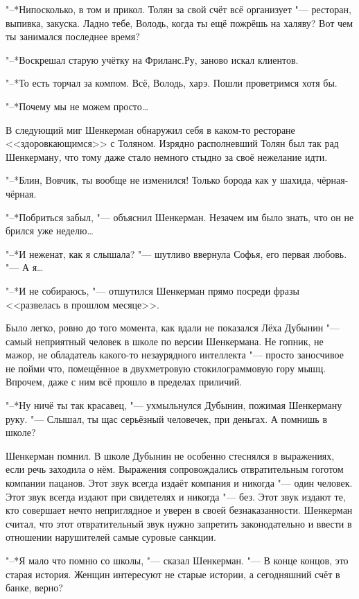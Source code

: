 "--*Нипосколько, в том и прикол.
Толян за свой счёт всё организует "--- ресторан, выпивка, закуска.
Ладно тебе, Володь, когда ты ещё пожрёшь на халяву?
Вот чем ты занимался последнее время?

"--*Воскрешал старую учётку на Фриланс.Ру, заново искал клиентов.

"--*То есть торчал за компом.
Всё, Володь, харэ.
Пошли проветримся хотя бы.

"--*Почему мы не можем просто\dots{}

В следующий миг Шенкерман обнаружил себя в каком-то ресторане <<здоровкающимся>> с Толяном.
Изрядно располневший Толян был так рад Шенкерману, что тому даже стало немного стыдно за своё нежелание идти.

"--*Блин, Вовчик, ты вообще не изменился!
Только борода как у шахида, чёрная-чёрная.

"--*Побриться забыл, "--- объяснил Шенкерман.
Незачем им было знать, что он не брился уже неделю\dots{}

"--*И неженат, как я слышала? "--- шутливо ввернула Софья, его первая любовь.
"--- А я\dots{}

"--*И не собираюсь, "--- отшутился Шенкерман прямо посреди фразы <<развелась в прошлом месяце>>.

Было легко, ровно до того момента, как вдали не показался Лёха Дубынин "--- самый неприятный человек в школе по версии Шенкермана.
Не гопник, не мажор, не обладатель какого-то незаурядного интеллекта "--- просто заносчивое не пойми что, помещённое в двухметровую стокилограммовую гору мышц.
Впрочем, даже с ним всё прошло в пределах приличий.

"--*Ну ничё ты так красавец, "--- ухмыльнулся Дубынин, пожимая Шенкерману руку.
"--- Слышал, ты щас серьёзный человечек, при деньгах.
А помнишь в школе?

Шенкерман помнил.
В школе Дубынин не особенно стеснялся в выражениях, если речь заходила о нём.
Выражения сопровождались отвратительным гоготом компании пацанов.
Этот звук всегда издаёт компания и никогда "--- один человек.
Этот звук всегда издают при свидетелях и никогда "--- без.
Этот звук издают те, кто совершает нечто неприглядное и уверен в своей безнаказанности.
Шенкерман считал, что этот отвратительный звук нужно запретить законодательно и ввести в отношении нарушителей самые суровые санкции.

"--*Я мало что помню со школы, "--- сказал Шенкерман.
"--- В конце концов, это старая история.
Женщин интересуют не старые истории, а сегодняшний счёт в банке, верно?

